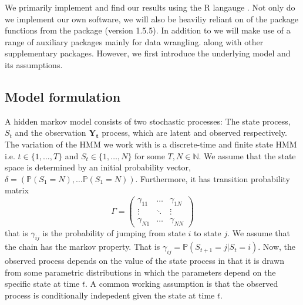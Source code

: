 We primarily implement and find our results using the R langauge \cite{RLang}.
Not only do we implement our own software, we will also be heaviliy reliant on of the package functions from the package  \cite{momentuHMM} (version 1.5.5). In addition to  we will make use of a range of auxiliary packages mainly for data wrangling.\cite{tidyverse}\cite{Rcpp} along with other supplementary packages.\cite{gridExtra}\cite{microbenchmark}\cite{ggthemes}\cite{ggmap}\cite{mapview} However, we first introduce the underlying model and its assumptions.
\subsection*{Model formulation}
A hidden markov model consists of two stochastic processes: The state process, $S_t$ and the observation $\mathbf{Y_t}$ process, which are latent and observed respectively. The variation of the HMM we work with is a discrete-time and finite state HMM i.e. $t\in\{1,\dots , T\}$ and $S_t\in\{1,\dots , N\}$ for some $T, N\in\mathbb{N}$. We assume that the state space is determined by an initial probability vector, $\delta = \left(\mathbb{P}(S_1 = N),\dots \mathbb{P}(S_1 = N)\right)$. Furthermore, it has transition probability matrix
\[
    \Gamma = \begin{pmatrix}
        \gamma_{11} & \dots &  \gamma_{1N} \\
        \vdots & \ddots & \vdots \\
        \gamma_{N1} & \dots & \gamma_{NN}
    \end{pmatrix}
\]
that is $\gamma_{ij}$ is the probability of jumping from state $i$ to state $j$. We assume that the chain has the markov property. That is $\gamma_{ij} = \mathbb{P}\left(S_{t+1} = j | S_t = i\right)$. Now, the observed process depends on the value of the state process in that it is drawn from some parametric distributions in which the parameters depend on the specific state at time $t$. A common working assumption is that the observed process is conditionally indepedent given the state at time $t$. 
\cite{UncoveringEcologicalState}